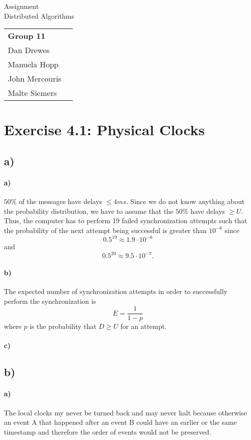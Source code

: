 \documentclass[12pt,a4paper]{article}
\begin{document}
\begin{center}
  \Large Assignment  \\
  \large Distributed Algorithms
\end{center}
\begin{flushright}
  \begin{tabular}{ll}
    \textbf{Group 11} \\
    Dan Drewes        \\ 
    Manuela Hopp      \\ 
    John Mercouris    \\
    Malte Siemers     \\
  \end{tabular} 
\end{flushright}


\section*{Exercise 4.1: Physical Clocks}
  \subsection*{a)} %
  	\paragraph{a)} $50\%$ of the messages have delays $\leq 4ms$. Since we do not know anything about the probability distribution, we have to assume that the $50\%$ have delays $\geq U$. Thus, the computer has to perform 19 failed synchronization attempts such that the probability of the next attempt being successful is greater than $10^{-6}$ since
  	\[0.5^{19} \approx 1.9 \cdot 10^{-6} \] 
  	and 
  	\[ 0.5^{20} \approx 9.5 \cdot 10^{-7} .\]
  	\paragraph{b)} The expected number of synchronization attempts in order to successfully perform the synchronization is 
  	\[ E = \frac{1}{1-p} \]
  	where $p$ is the probability that $D \geq U$ for an attempt.
  	\paragraph{c)}
  \subsection*{b)} %
    \paragraph{a)} The local clocks my never be turned back and may never halt because otherwise an event A that happened after an event B could have an earlier or the same timestamp and therefore the order of events would not be preserved.
\end{document}
